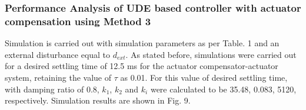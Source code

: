 \documentclass[conference]{IEEEtran}
\begin{document}
\subsubsection{Performance Analysis of UDE based controller with actuator compensation using Method 3}
Simulation is carried out with simulation parameters as per Table. 1 and an external disturbance equal to $d_{ext}$. As stated before, simulations were carried out for a desired settling time of 12.5 ms for the actuator compensator-actuator system, retaining the value of $\tau$ as 0.01. For this value of desired settling time, with damping ratio of 0.8, $k_1$, $k_2$ and $k_i$ were calculated to be 35.48, 0.083, 5120, respectively. Simulation results are shown in Fig. 9.
\end{document}
